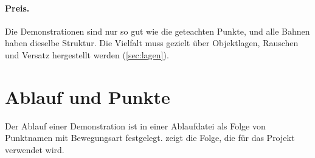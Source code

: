 \paragraph{Preis.} Die Demonstrationen sind nur so gut wie die geteachten Punkte, und alle
Bahnen haben dieselbe Struktur. Die Vielfalt muss gezielt über Objektlagen, Rauschen und
Versatz hergestellt werden (\cref{sec:lagen}).

\section{Ablauf und Punkte}
\label{sec:ablauf-punkte}

Der Ablauf einer Demonstration ist in einer Ablaufdatei als Folge von Punktnamen mit
Bewegungsart festgelegt.  zeigt die Folge, die für das Projekt
verwendet wird.

